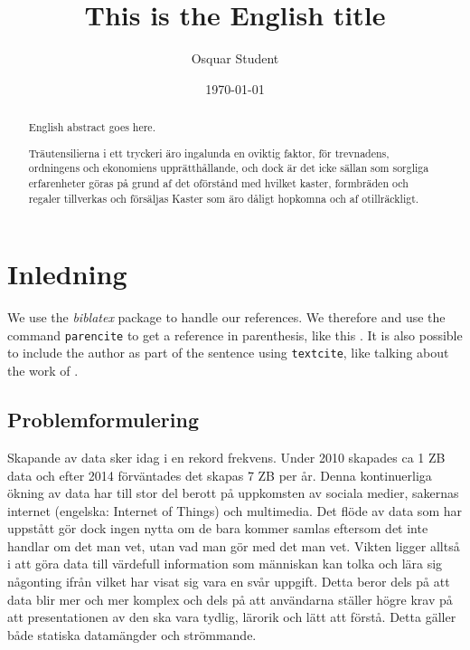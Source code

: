 \documentclass{kththesis}
\title{This is the English title}
\author{Osquar Student}
\date{\today}
\begin{document}
\frontmatter

\titlepage

\begin{abstract}
  English abstract goes here.

  \blindtext
\end{abstract}


\begin{otherlanguage}{swedish}
  \begin{abstract}
    Träutensilierna i ett tryckeri äro ingalunda en oviktig faktor,
    för trevnadens, ordningens och ekonomiens upprätthållande, och
    dock är det icke sällan som sorgliga erfarenheter göras på grund
    af det oförstånd med hvilket kaster, formbräden och regaler
    tillverkas och försäljas Kaster som äro dåligt hopkomna och af
    otillräckligt.
  \end{abstract}
\end{otherlanguage}


\tableofcontents


\mainmatter


\chapter{Inledning}


We use the \emph{biblatex} package to handle our references. We therefore and use the
command \texttt{parencite} to get a reference in parenthesis, like this
\parencite{heisenberg2015}.  It is also possible to include the author
as part of the sentence using \texttt{textcite}, like talking about
the work of \textcite{einstein2016}.

\section{Problemformulering}
Skapande av data sker idag i en rekord frekvens. Under 2010 skapades ca 1 ZB data och efter 2014 förväntades det skapas 7 ZB per år.\parencite{1} Denna kontinuerliga ökning av data har till stor del berott på uppkomsten av sociala medier, sakernas internet (engelska: Internet of Things) och multimedia.\parencite{2} Det flöde av data som har uppstått gör dock ingen nytta om de bara kommer samlas eftersom det inte handlar om det man vet, utan vad man gör med det man vet.\parencite{3} Vikten ligger alltså i att göra data till värdefull information som människan kan tolka och lära sig någonting ifrån vilket har visat sig vara en svår uppgift. Detta beror dels på att data blir mer och mer komplex och dels på att användarna ställer högre krav på att presentationen av den ska vara tydlig, lärorik och lätt att förstå. Detta gäller både statiska datamängder och strömmande.
\end{document}
